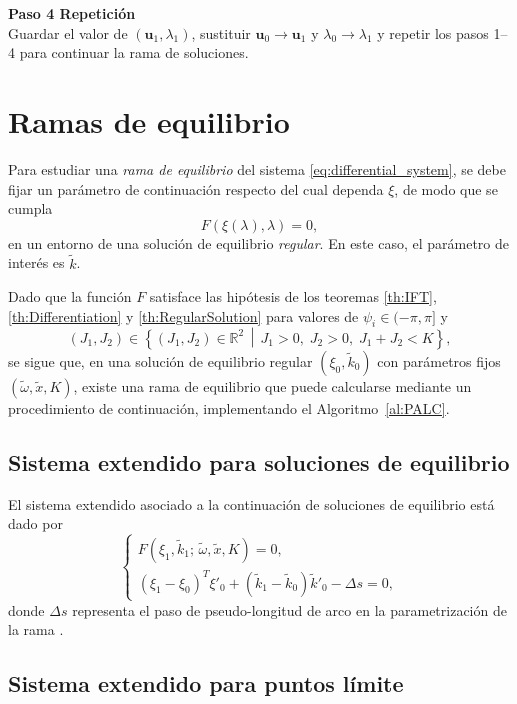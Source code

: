 \begin{algorithm}[H]
    \textbf{Paso 4 Repetición} \\
    Guardar el valor de $ (\mathbf{u}_1, \lambda_1) $, sustituir $ \mathbf{u}_0 \to \mathbf{u}_1 $
    y $ \lambda_0 \to \lambda_1 $ y repetir los pasos 1–4 para continuar la rama de soluciones.
    \label{al:PALC}
\end{algorithm}

\section{Ramas de equilibrio}

Para estudiar una \emph{rama de equilibrio} del sistema \eqref{eq:differential_system},
se debe fijar un parámetro de continuación respecto del cual dependa
$\xi$, de modo que se cumpla
\[
    F(\xi(\lambda), \lambda) = 0,
\]
en un entorno de una solución de equilibrio \emph{regular}.
En este caso, el parámetro de interés es $\tilde{k}$.

Dado que la función $F$ satisface las hipótesis de los teoremas
\ref{th:IFT}, \ref{th:Differentiation} y \ref{th:RegularSolution} para valores de $\psi_i \in (-\pi,\pi]$ y
\[
    (J_1,J_2) \in \left\{ (J_1, J_2) \in \mathbb{R}^2 \,\middle|\,
    J_1 > 0,\; J_2 > 0,\; J_1 + J_2 < K \right\},
\]
se sigue que, en una solución de equilibrio regular
$(\xi_0, \tilde{k}_0)$ con parámetros fijos $(\tilde{\omega}, \tilde{x}, K)$,
existe una rama de equilibrio que puede calcularse mediante
un procedimiento de continuación, implementando el
Algoritmo~\ref{al:PALC}.

\subsection{Sistema extendido para soluciones de equilibrio}

El sistema extendido asociado a la continuación de soluciones de equilibrio está dado por
\begin{equation}
    \begin{cases}
        F(\xi_1, \tilde{k}_1;\, \tilde{\omega}, \tilde{x}, K) = 0, \\[6pt]
        (\xi_1 - \xi_0)^T \xi'_0 +
        (\tilde{k}_1 - \tilde{k}_0)\tilde{k}'_0
        - \Delta s = 0,
    \end{cases}
    \label{eq:System_equilibrium}
\end{equation}
donde $\Delta s$ representa el paso de pseudo-longitud de arco en la parametrización de la rama \cite{Doedel2007}.

\subsection{Sistema extendido para puntos límite}

